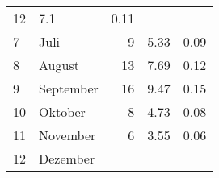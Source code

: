 \begin{longtable}{lXrrr}
       \num{12} &
       \num[round-mode=places,round-precision=2]{7.1} &
         \num[round-mode=places,round-precision=2]{0.11} \\

     7 &
     \multicolumn{1}{X}{ Juli   } &


       \num{9} &
       \num[round-mode=places,round-precision=2]{5.33} &
         \num[round-mode=places,round-precision=2]{0.09} \\

     8 &
     \multicolumn{1}{X}{ August   } &


       \num{13} &
       \num[round-mode=places,round-precision=2]{7.69} &
         \num[round-mode=places,round-precision=2]{0.12} \\

     9 &
     \multicolumn{1}{X}{ September   } &


       \num{16} &
       \num[round-mode=places,round-precision=2]{9.47} &
         \num[round-mode=places,round-precision=2]{0.15} \\

     10 &
     \multicolumn{1}{X}{ Oktober   } &


       \num{8} &
       \num[round-mode=places,round-precision=2]{4.73} &
         \num[round-mode=places,round-precision=2]{0.08} \\

     11 &
     \multicolumn{1}{X}{ November   } &


       \num{6} &
       \num[round-mode=places,round-precision=2]{3.55} &
         \num[round-mode=places,round-precision=2]{0.06} \\

     12 &
     \multicolumn{1}{X}{ Dezember   } &



\end{longtable}
